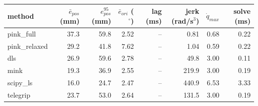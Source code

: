 \begin{tabular}{lrrrrrrr}
\toprule
method & $\bar{e}_{pos}$ (mm) & $e_{pos}^{95}$ (mm) & $\bar{e}_{ori}$ ($^\circ$) & lag (ms) & jerk (rad/s$^3$) & $\dot{q}_{max}$ & solve (ms) \\
\midrule
pink\_full & 37.3 & 59.8 & 2.52 & -- & 0.81 & 0.68 & 0.22 \\
pink\_relaxed & 29.2 & 41.8 & 7.62 & -- & 1.04 & 0.59 & 0.22 \\
dls & 26.9 & 59.6 & 2.78 & -- & 49.8 & 3.00 & 0.11 \\
mink & 19.3 & 36.9 & 2.55 & -- & 219.9 & 3.00 & 0.19 \\
scipy\_ls & 16.0 & 24.7 & 2.47 & -- & 440.9 & 6.53 & 3.33 \\
telegrip & 23.7 & 53.0 & 2.64 & -- & 131.5 & 3.00 & 0.19 \\
\bottomrule
\end{tabular}
